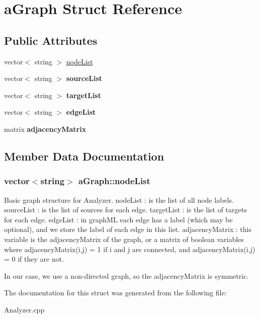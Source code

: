 \hypertarget{structa_graph}{\section{a\-Graph Struct Reference}
\label{structa_graph}
}
\subsection*{Public Attributes}
\begin{DoxyCompactItemize}
\item 
vector$<$ string $>$ \hyperlink{structa_graph_a24704c7ee0c26fa0b6ee3a3e573e7f26}{node\-List}
\item 
\hypertarget{structa_graph_aebf17e38c2240d272d5542817462b17b}{vector$<$ string $>$ {\bfseries source\-List}}\label{structa_graph_aebf17e38c2240d272d5542817462b17b}

\item 
\hypertarget{structa_graph_a445e0a78861c99bde1bd67b3df42b95b}{vector$<$ string $>$ {\bfseries target\-List}}\label{structa_graph_a445e0a78861c99bde1bd67b3df42b95b}

\item 
\hypertarget{structa_graph_afef9e772dd78c78cf0d18f93b8c15bb9}{vector$<$ string $>$ {\bfseries edge\-List}}\label{structa_graph_afef9e772dd78c78cf0d18f93b8c15bb9}

\item 
\hypertarget{structa_graph_a3fe81eecfe70643373a04548bbc7af2e}{matrix {\bfseries adjacency\-Matrix}}\label{structa_graph_a3fe81eecfe70643373a04548bbc7af2e}

\end{DoxyCompactItemize}


\subsection{Member Data Documentation}
\hypertarget{structa_graph_a24704c7ee0c26fa0b6ee3a3e573e7f26}{
\subsubsection[{node\-List}]{\setlength{\rightskip}{0pt plus 5cm}vector$<$string$>$ a\-Graph\-::node\-List}}\label{structa_graph_a24704c7ee0c26fa0b6ee3a3e573e7f26}
Basic graph structure for Analyzer. node\-List \-: is the list of all node labels. source\-List \-: is the list of sources for each edge. target\-List \-: is the list of targets for each edge. edge\-List \-: in graph\-M\-L each edge has a label (which may be optional), and we store the label of each edge in this list. adjacency\-Matrix \-: this variable is the adjacency\-Matrix of the graph, or a matrix of boolean variables where adjacency\-Matrix(i,j) = 1 if i and j are connected, and adjacency\-Matrix(i,j) = 0 if they are not.

In our case, we use a non-\/directed graph, so the adjacency\-Matrix is symmetric. 

The documentation for this struct was generated from the following file\-:\begin{DoxyCompactItemize}
\item 
Analyzer.\-cpp\end{DoxyCompactItemize}
